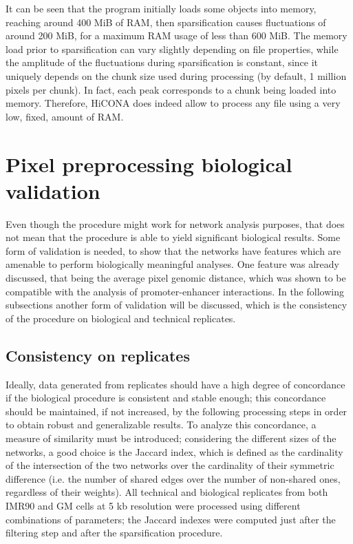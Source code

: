 It can be seen that the program initially loads some objects into memory, reaching around 400 MiB of RAM, then sparsification causes fluctuations of around 200 MiB, for a maximum RAM usage of less than 600 MiB. The memory load prior to sparsification can vary slightly depending on file properties, while the amplitude of the fluctuations during sparsification is constant, since it uniquely depends on the chunk size used during processing (by default, 1 million pixels per chunk). In fact, each peak corresponds to a chunk being loaded into memory. Therefore, HiCONA does indeed allow to process any file using a very low, fixed, amount of RAM.

\section{Pixel preprocessing biological validation}

Even though the procedure might work for network analysis purposes, that does not mean that the procedure is able to yield significant biological results. Some form of validation is needed, to show that the networks have features which are amenable to perform biologically meaningful analyses. One feature was already discussed, that being the average pixel genomic distance, which was shown to be compatible with the analysis of promoter-enhancer interactions. In the following subsections another form of validation will be discussed, which is the consistency of the procedure on biological and technical replicates.

\subsection{Consistency on replicates}

Ideally, data generated from replicates should have a high degree of concordance if the biological procedure is consistent and stable enough; this concordance should be maintained, if not increased, by the following processing steps in order to obtain robust and generalizable results. To analyze this concordance, a measure of similarity must be introduced; considering the different sizes of the networks, a good choice is the Jaccard index, which is defined as the cardinality of the intersection of the two networks over the cardinality of their symmetric difference (i.e. the number of shared edges over the number of non-shared ones, regardless of their weights). All technical and biological replicates from both IMR90 and GM cells at 5 kb resolution were processed using different combinations of parameters; the Jaccard indexes were computed just after the filtering step and after the sparsification procedure.

